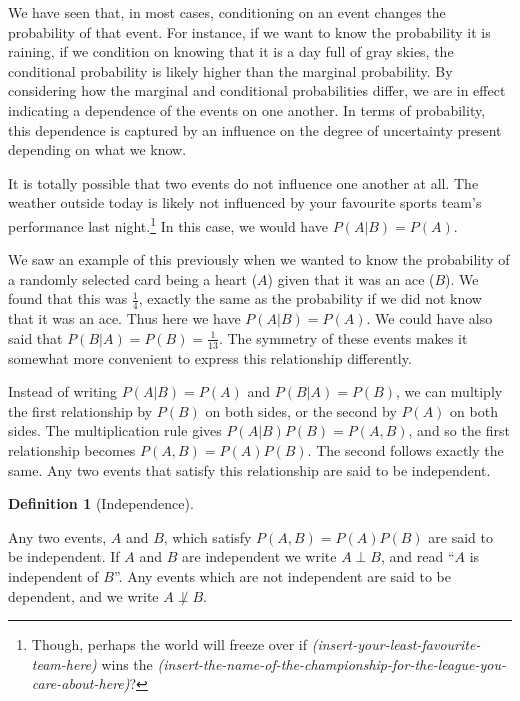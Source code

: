 \documentclass[
  letterpaper,
  DIV=11,
  numbers=noendperiod]{scrreprt}
\theoremstyle{definition}
\newtheorem{definition}{Definition}[chapter]
\theoremstyle{definition}
\theoremstyle{definition}
\theoremstyle{remark}
\begin{document}
We have seen that, in most cases, conditioning on an event changes the
probability of that event. For instance, if we want to know the
probability it is raining, if we condition on knowing that it is a day
full of gray skies, the conditional probability is likely higher than
the marginal probability. By considering how the marginal and
conditional probabilities differ, we are in effect indicating a
dependence of the events on one another. In terms of probability, this
dependence is captured by an influence on the degree of uncertainty
present depending on what we know.

It is totally possible that two events do not influence one another at
all. The weather outside today is likely not influenced by your
favourite sports team's performance last night.\footnote{Though, perhaps
  the world will freeze over if
  \emph{(insert-your-least-favourite-team-here)} wins the
  \emph{(insert-the-name-of-the-championship-for-the-league-you-care-about-here)}?}
In this case, we would have \(P(A|B) = P(A)\).

We saw an example of this previously when we wanted to know the
probability of a randomly selected card being a heart (\(A\)) given that
it was an ace (\(B\)). We found that this was \(\frac{1}{4}\), exactly
the same as the probability if we did not know that it was an ace. Thus
here we have \(P(A|B)=P(A)\). We could have also said that
\(P(B|A)=P(B)=\frac{1}{13}\). The symmetry of these events makes it
somewhat more convenient to express this relationship differently.

Instead of writing \(P(A|B) = P(A)\) and \(P(B|A) = P(B)\), we can
multiply the first relationship by \(P(B)\) on both sides, or the second
by \(P(A)\) on both sides. The multiplication rule gives
\(P(A|B)P(B) = P(A,B)\), and so the first relationship becomes
\(P(A,B) = P(A)P(B)\). The second follows exactly the same. Any two
events that satisfy this relationship are said to be independent.

\begin{definition}[Independence]\protect\hypertarget{def-independence}{}\label{def-independence}

Any two events, \(A\) and \(B\), which satisfy \(P(A,B) = P(A)P(B)\) are
said to be independent. If \(A\) and \(B\) are independent we write
\(A\perp B\), and read ``\(A\) is independent of \(B\)''. Any events
which are not independent are said to be dependent, and we write
\(A\not\perp B\).

\end{definition}
\end{document}
